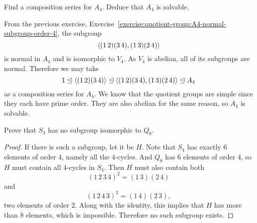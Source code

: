  Find a composition series for $A_4$. Deduce that $A_4$
is solvable.
\begin{solution}
  From the previous exercise,
  Exercise~\ref{exercise:quotient-group:A4-normal-subgroup-order-4},
  the subgroup
  \begin{equation*}
    \langle{(1\,2)(3\,4), (1\,3)(2\,4)}\rangle
  \end{equation*}
  is normal in $A_4$ and is isomorphic to $V_4$. As $V_4$ is abelian,
  all of its subgroups are normal. Therefore we may take
  \begin{equation*}
    1 \trianglelefteq \langle{(1\,2)(3\,4)}\rangle \trianglelefteq
    \langle{(1\,2)(3\,4), (1\,3)(2\,4)}\rangle \trianglelefteq A_4
  \end{equation*}
  as a composition series for $A_4$. We know that the quotient groups
  are simple since they each have prime order. They are also abelian
  for the same reason, so $A_4$ is solvable.
\end{solution}

 Prove that $S_4$ has no subgroup isomorphic to $Q_8$.
\begin{proof}
  If there is such a subgroup, let it be $H$. Note that $S_4$ has
  exactly $6$ elements of order $4$, namely all the $4$-cycles. And
  $Q_8$ has $6$ elements of order $4$, so $H$ must contain all
  $4$-cycles in $S_4$. Then $H$ must also contain both
  \begin{equation*}
    (1\,2\,3\,4)^2 = (1\,3)(2\,4)
  \end{equation*}
  and
  \begin{equation*}
    (1\,2\,4\,3)^2 = (1\,4)(2\,3),
  \end{equation*}
  two elements of order $2$. Along with the identity, this implies
  that $H$ has more than $8$ elements, which is impossible. Therefore
  no such subgroup exists.
\end{proof}

